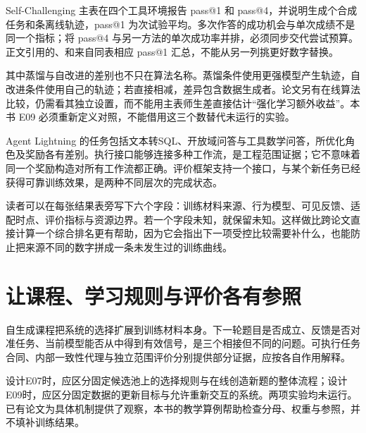 Self-Challenging 主表在四个工具环境报告 pass@1 和 pass@4，并说明生成个合成任务和条离线轨迹，pass@1 为次试验平均\cite{self-challenging-2506}。多次作答的成功机会与单次成绩不是同一个指标；将 pass@4 与另一方法的单次成功率并排，必须同步交代尝试预算。正文引用的、和来自同表相应 pass@1 汇总，不能从另一列挑更好数字替换。

其中蒸馏与自改进的差别也不只在算法名称。蒸馏条件使用更强模型产生轨迹，自改进条件使用自己的轨迹；若直接相减，差异包含数据生成者。论文另有在线算法比较，仍需看其独立设置，而不能用主表师生差直接估计“强化学习额外收益”。本书 E09 必须重新定义对照，不能借用这三个数替代未运行的实验。

Agent Lightning 的任务包括文本转SQL、开放域问答与工具数学问答，所优化角色及奖励各有差别\cite{agent-lightning-2508}。执行接口能够连接多种工作流，是工程范围证据；它不意味着同一个奖励构造对所有工作流都正确。评价框架支持一个接口，与某个新任务已经获得可靠训练效果，是两种不同层次的完成状态。

读者可以在每张结果表旁写下六个字段：训练材料来源、行为模型、可见反馈、适配时点、评价指标与资源边界。若一个字段未知，就保留未知。这样做比跨论文直接计算一个综合排名更有帮助，因为它会指出下一项受控比较需要补什么，也能防止把来源不同的数字拼成一条未发生过的训练曲线。

\section{让课程、学习规则与评价各有参照}
\label{sec:ch11-claims}

自生成课程把系统的选择扩展到训练材料本身。下一轮题目是否成立、反馈是否对准任务、当前模型能否从中得到有效信号，是三个相接但不同的问题。可执行任务合同、内部一致性代理与独立范围评价分别提供部分证据，应按各自作用解释。

设计E07时，应区分固定候选池上的选择规则与在线创造新题的整体流程；设计E09时，应区分固定数据的更新目标与允许重新交互的系统。两项实验均未运行。已有论文为具体机制提供了观察，本书的教学算例帮助检查分母、权重与参照，并不填补训练结果。



